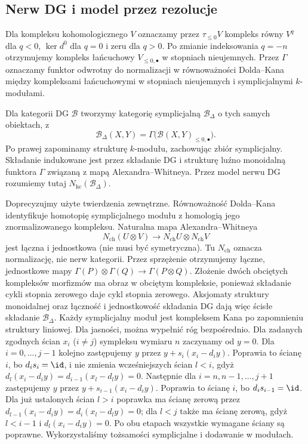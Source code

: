 \subsection{Nerw DG i model przez rezolucje}

\begin{definicja}\label{cat:def:derived-dg-nerve}
Dla kompleksu kohomologicznego $V$ oznaczamy przez $\tau_{\leq0}V$ kompleks równy $V^q$ dla $q<0$, $\ker d^0$ dla $q=0$ i zeru dla $q>0$. Po zmianie indeksowania $q=-n$ otrzymujemy kompleks łańcuchowy $V_{\leq0,\bullet}$ w stopniach nieujemnych. Przez $\Gamma$ oznaczamy funktor odwrotny do normalizacji w równoważności Dolda--Kana między kompleksami łańcuchowymi w stopniach nieujemnych i symplicjalnymi $k$-modułami.

Dla kategorii DG $\mathcal B$ tworzymy kategorię symplicjalną $\mathcal B_\Delta$ o tych samych obiektach, z
\[
 \mathcal B_\Delta(X,Y)
 =\Gamma\bigl(\mathcal B(X,Y)_{\leq0,\bullet}\bigr).
\]
Po prawej zapominamy strukturę $k$-modułu, zachowując zbiór symplicjalny. Składanie indukowane jest przez składanie DG i strukturę luźno monoidalną funktora $\Gamma$ związaną z mapą Alexandra--Whitneya. Przez model nerwu DG rozumiemy tutaj $N_{\mathrm{hc}}(\mathcal B_\Delta)$.
\end{definicja}

Doprecyzujmy użyte twierdzenia zewnętrzne. Równoważność Dolda--Kana identyfikuje homotopię symplicjalnego modułu z homologią jego znormalizowanego kompleksu. Naturalna mapa Alexandra--Whitneya
\[
 N_{\mathrm{ch}}(U\otimes V)\longrightarrow
 N_{\mathrm{ch}}U\otimes N_{\mathrm{ch}}V
\]
jest łączna i jednostkowa (nie musi być symetryczna). Tu $N_{\mathrm{ch}}$ oznacza normalizację, nie nerw kategorii. Przez sprzężenie otrzymujemy łączne, jednostkowe mapy $\Gamma(P)\otimes\Gamma(Q)\to\Gamma(P\otimes Q)$. Złożenie dwóch obciętych kompleksów morfizmów ma obraz w obciętym kompleksie, ponieważ składanie cykli stopnia zerowego daje cykl stopnia zerowego. Aksjomaty struktury monoidalnej oraz łączność i jednostkowość składania DG dają więc ścisłe składanie $\mathcal B_\Delta$. Każdy symplicjalny moduł jest kompleksem Kana po zapomnieniu struktury liniowej. Dla jasności, można wypełnić róg bezpośrednio. Dla zadanych zgodnych ścian $x_i$ ($i\ne j$) sympleksu wymiaru $n$ zaczynamy od $y=0$. Dla $i=0,\ldots,j-1$ kolejno zastępujemy $y$ przez $y+s_i(x_i-d_i y)$. Poprawia to ścianę $i$, bo $d_i s_i=\id$, i nie zmienia wcześniejszych ścian $l<i$, gdyż $d_l(x_i-d_i y)=d_{i-1}(x_l-d_l y)=0$. Następnie dla $i=n,n-1,\ldots,j+1$ zastępujemy $y$ przez $y+s_{i-1}(x_i-d_i y)$. Poprawia to ścianę $i$, bo $d_i s_{i-1}=\id$. Dla już ustalonych ścian $l>i$ poprawka ma ścianę zerową przez $d_{l-1}(x_i-d_i y)=d_i(x_l-d_l y)=0$; dla $l<j$ także ma ścianę zerową, gdyż $l<i-1$ i $d_l(x_i-d_i y)=0$. Po obu etapach wszystkie wymagane ściany są poprawne. Wykorzystaliśmy tożsamości symplicjalne i dodawanie w modułach.

